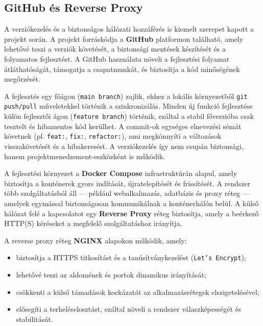 \subsection{GitHub és Reverse Proxy}

A verziókezelés és a biztonságos hálózati hozzáférés is kiemelt szerepet kapott a projekt során.  
A projekt forráskódja a \textbf{GitHub} platformon található, amely lehetővé teszi a verziók követését, a biztonsági mentések készítését és a folyamatos fejlesztést.  
A GitHub használata növeli a fejlesztési folyamat átláthatóságát, támogatja a csapatmunkát, és biztosítja a kód minőségének megőrzését.

A fejlesztés egy főágon (\texttt{main branch}) zajlik, ehhez a lokális környezetből \texttt{git push/pull} műveletekkel történik a szinkronizálás.  
Minden új funkció fejlesztése külön fejlesztői ágon (\texttt{feature branch}) történik, ezáltal a stabil főverzióba csak tesztelt és hibamentes kód kerülhet.  
A commit-ok egységes elnevezési sémát követnek (pl. \texttt{feat:}, \texttt{fix:}, \texttt{refactor:}), ami megkönnyíti a változások visszakövetését és a hibakeresést.  
A verziókezelés így nem csupán biztonsági, hanem projektmenedzsment-eszközként is működik.

A fejlesztési környezet a \textbf{Docker Compose} infrastruktúrán alapul, amely biztosítja a konténerek gyors indítását, újratelepítését és frissítését.  
A rendszer több szolgáltatásból áll — például webalkalmazás, adatbázis és proxy réteg — amelyek egymással biztonságosan kommunikálnak a konténerhálón belül.  
A külső hálózat felé a kapcsolatot egy \textbf{Reverse Proxy} réteg biztosítja, amely a beérkező HTTP(S) kéréseket a megfelelő szolgáltatáshoz irányítja.

A reverse proxy réteg \textbf{NGINX} alapokon működik, amely:
\begin{itemize}
    \item biztosítja a HTTPS titkosítást és a tanúsítványkezelést (\texttt{Let's Encrypt});
    \item lehetővé teszi az aldomének és portok dinamikus irányítását;
    \item csökkenti a külső támadások kockázatát az alkalmazásrétegek elszigetelésével;
    \item elősegíti a terheléselosztást, ezáltal növeli a rendszer válaszképességét és stabilitását.
\end{itemize}

